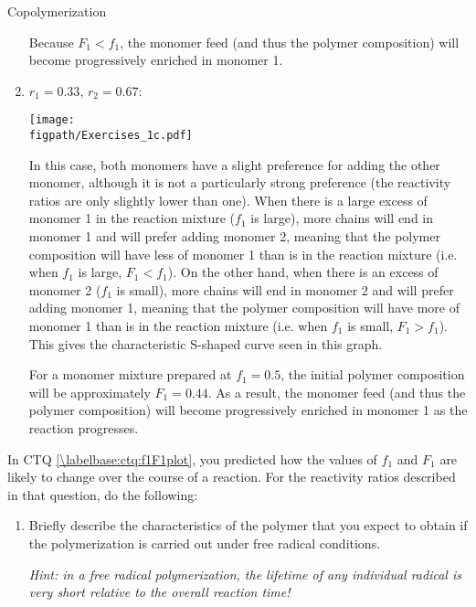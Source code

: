 \begin{activity}{Copolymerization}
\begin{exercises}
\begin{enumerate}
\begin{solution}{}
					Because $F_1<f_1$, the monomer feed (and thus the polymer composition) will become progressively enriched in monomer 1.
					
				\end{solution}
				
				
			\item $r_1=0.33$, $r_2=0.67$:
	
				\begin{solution}{}
					\centerline{\texttt{[image: \\figpath/Exercises\_1c.pdf]}}
					
					In this case, both monomers have a slight preference for adding the other monomer, although it is not a particularly strong preference (the reactivity ratios are only slightly lower than one).  When there is a large excess of monomer 1 in the reaction mixture ($f_1$ is large), more chains will end in monomer 1 and will prefer adding monomer 2, meaning that the polymer composition will have less of monomer 1 than is in the reaction mixture (i.e. when $f_1$ is large, $F_1<f_1$).  On the other hand, when there is an excess of monomer 2 ($f_1$ is small), more chains will end in monomer 2 and will prefer adding monomer 1, meaning that the polymer composition will have more of monomer 1 than is in the reaction mixture (i.e. when $f_1$ is small, $F_1 > f_1$).  This gives the characteristic S-shaped curve seen in this graph.
					
					For a monomer mixture prepared at $f_1=0.5$, the initial polymer composition will be approximately $F_1=0.44$.  As a result, the monomer feed (and thus the polymer composition) will become progressively enriched in monomer 1 as the reaction progresses.
			\end{solution}
		\end{enumerate}
	
	\exercise In CTQ \ref{\labelbase:ctq:f1F1plot}, you predicted how the values of $f_1$ and $F_1$ are likely to change over the course of a reaction.  For the reactivity ratios described in that question, do the following: \label{\labelbase:exc:compshift}
	
		\begin{enumerate}
			\item Briefly describe the characteristics of the polymer that you expect to obtain if the polymerization is carried out under free radical conditions.
			
				\emph{Hint: in a free radical polymerization, the lifetime of any individual radical is very short relative to the overall reaction time!}
			

\end{enumerate}
\end{exercises}
\end{activity}
